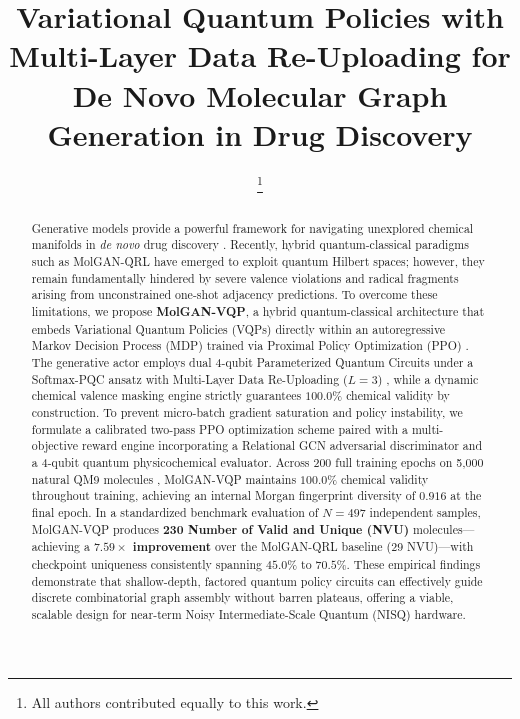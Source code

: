 \documentclass[conference]{IEEEtran}
\begin{document}
\title{Variational Quantum Policies with Multi-Layer Data Re-Uploading for De Novo Molecular Graph Generation in Drug Discovery}

\author{
\thanks{All authors contributed equally to this work.}
}

\maketitle

\begin{abstract}
Generative models provide a powerful framework for navigating unexplored chemical manifolds in \textit{de novo} drug discovery \cite{decao2018molgan,you2018graph}. Recently, hybrid quantum-classical paradigms such as MolGAN-QRL \cite{hergli2026} have emerged to exploit quantum Hilbert spaces; however, they remain fundamentally hindered by severe valence violations and radical fragments arising from unconstrained one-shot adjacency predictions. To overcome these limitations, we propose \textbf{MolGAN-VQP}, a hybrid quantum-classical architecture that embeds Variational Quantum Policies (VQPs) directly within an autoregressive Markov Decision Process (MDP) trained via Proximal Policy Optimization (PPO) \cite{schulman2017}. The generative actor employs dual 4-qubit Parameterized Quantum Circuits under a Softmax-PQC ansatz with Multi-Layer Data Re-Uploading ($L=3$) \cite{jerbi2021parametrized,perez2020data}, while a dynamic chemical valence masking engine strictly guarantees $100.0\%$ chemical validity by construction. To prevent micro-batch gradient saturation and policy instability, we formulate a calibrated two-pass PPO optimization scheme paired with a multi-objective reward engine incorporating a Relational GCN adversarial discriminator and a 4-qubit quantum physicochemical evaluator. Across 200 full training epochs on 5,000 natural QM9 molecules \cite{ruddigkeit2012}, MolGAN-VQP maintains $100.0\%$ chemical validity throughout training, achieving an internal Morgan fingerprint diversity of $0.916$ at the final epoch. In a standardized benchmark evaluation of $N = 497$ independent samples, MolGAN-VQP produces \textbf{230 Number of Valid and Unique (NVU)} molecules---achieving a \textbf{$7.59\times$ improvement} over the MolGAN-QRL baseline (29 NVU)---with checkpoint uniqueness consistently spanning $45.0\%$ to $70.5\%$. These empirical findings demonstrate that shallow-depth, factored quantum policy circuits can effectively guide discrete combinatorial graph assembly without barren plateaus, offering a viable, scalable design for near-term Noisy Intermediate-Scale Quantum (NISQ) hardware.
\end{abstract}
\end{document}
